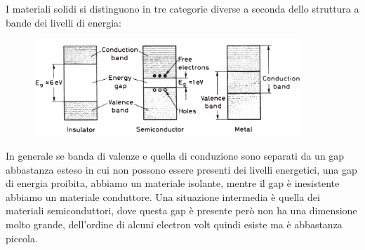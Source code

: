 I materiali solidi si distinguono in tre categorie diverse a seconda dello struttura a bande dei livelli di energia:
\begin{figure}[H]
   \centering
   \includegraphics[width=0.9\textwidth]{immagini/bande_valenza_e_conduzione.png}
\end{figure}
In generale se banda di valenze e quella di conduzione sono separati da un gap abbastanza esteso in cui non possono essere presenti dei livelli energetici, una gap di energia proibita, abbiamo un materiale isolante, mentre il gap è inesistente abbiamo un materiale conduttore. Una situazione intermedia è quella dei materiali semiconduttori, dove questa gap è presente  però non ha una dimensione molto grande, dell'ordine di alcuni electron volt quindi esiste ma è abbastanza piccola.

